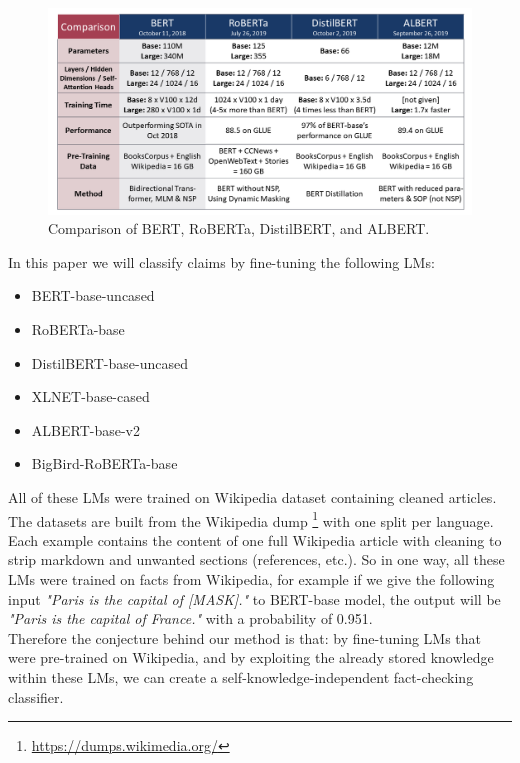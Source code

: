 \documentclass[conference]{IEEEtran}
\begin{document}
\begin{figure}[htp]
    \centering
    \includegraphics[scale=0.28]{lm_compar.png}
    \caption[Comparison]{Comparison of BERT, RoBERTa, DistilBERT, and ALBERT. \footnotemark}
    \label{fig:lm_compar}
\end{figure}

In this paper we will classify claims by fine-tuning the following LMs:

\begin{itemize}
\item BERT-base-uncased \cite{devlin2018bert}
\item RoBERTa-base \cite{liu2019roberta}
\item DistilBERT-base-uncased \cite{sanh2019distilbert}
\item XLNET-base-cased \cite{yang2019xlnet}
\item ALBERT-base-v2 \cite{lan2019albert}
\item BigBird-RoBERTa-base \cite{zaheer2020big}\\
\end{itemize}

All of these LMs were trained on Wikipedia dataset containing cleaned articles. The datasets are built from the Wikipedia dump \footnote{\url{https://dumps.wikimedia.org/}} with one split per language. Each example contains the content of one full Wikipedia article with cleaning to strip markdown and unwanted sections (references, etc.). So in one way, all these LMs were trained on facts from Wikipedia, for example if we give the following input \textit{"Paris is the capital of [MASK]."} to BERT-base model, the output will be \textit{"Paris is the capital of France."} with a probability of 0.951.\\
Therefore the conjecture behind our method is that: by fine-tuning LMs that were pre-trained on Wikipedia, and by exploiting the already stored knowledge within these LMs, we can create a self-knowledge-independent fact-checking classifier.
\end{document}
